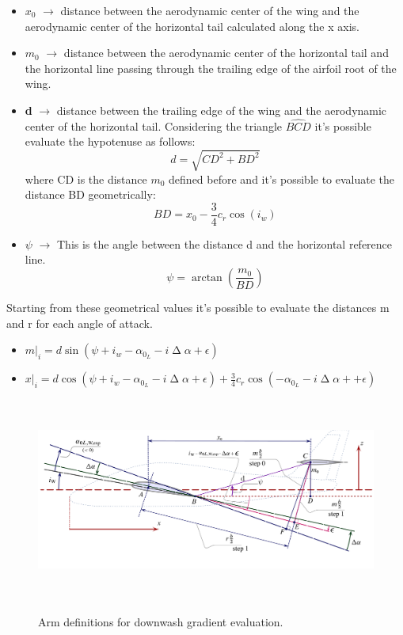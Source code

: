 \begin{itemize}
\item {\bfseries $x_0$}  $\rightarrow$ distance between the aerodynamic center of the wing and the aerodynamic center of the horizontal tail calculated along the x axis.  
\item {\bfseries $m_0$}  $\rightarrow$ distance between the aerodynamic center of the horizontal tail and the horizontal line passing through the trailing edge of the airfoil root of the wing.
\item {\bfseries d}  $\rightarrow$ distance between the trailing edge of the wing and the aerodynamic center of the horizontal tail. Considering the triangle $ \hat{BCD} $ it's possible evaluate the hypotenuse as follows:
\begin{equation}
d= \sqrt{CD^2 + BD^2}
\end{equation} 
where CD is the distance $m_0$ defined before and it's possible to evaluate the distance BD geometrically:
\begin{equation}
BD = x_0 - \frac{3}{4} c_r \cos(i_w)
\end{equation}
\item {\bfseries $\psi$}  $\rightarrow$ This is the angle between the distance d and the horizontal reference line.
\begin{equation}
\psi = \arctan(\frac{m_0}{BD})
\end{equation}
\end{itemize}

Starting from these geometrical values it's possible to evaluate the distances m and r for each angle of attack.

\begin{itemize}
	\item $m|_i = d \sin(\psi + i_w - \alpha_{0_L}- i \upDelta \alpha + \epsilon)$
	\item $x|_i =  d \cos(\psi + i_w - \alpha_{0_L}- i \upDelta \alpha + \epsilon) + \frac{3}{4} c_r \cos(-\alpha_{0_L} - i \upDelta \alpha+ + \epsilon)$
\end{itemize}

\begin{figure}[H]
\centering
{\includegraphics[height=6.69cm]{Immagini/arms_definitions_mod.pdf}} 
\caption{Arm definitions for downwash gradient evaluation.}
\label{armdefinitiondownwa}
\end{figure} 


